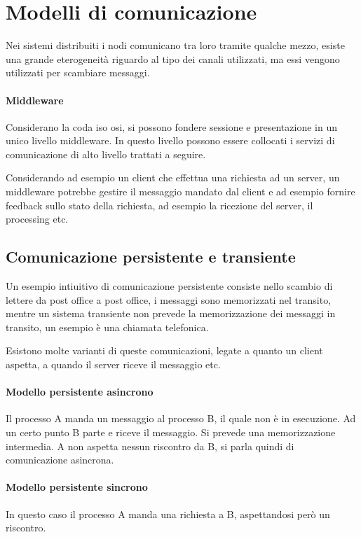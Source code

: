 \section{Modelli di comunicazione}
Nei sistemi distribuiti i nodi comunicano tra loro tramite qualche
mezzo, esiste una grande eterogeneità riguardo al tipo dei canali utilizzati, 
ma essi vengono utilizzati per scambiare messaggi.

\paragraph{Middleware}
Considerano la coda iso osi, si possono fondere sessione e presentazione 
in un unico livello middleware. In questo livello possono essere collocati i 
servizi di comunicazione di alto livello trattati a seguire.

Considerando ad esempio un client che effettua una richiesta ad un 
server, un middleware potrebbe gestire il messaggio mandato 
dal client e ad esempio fornire feedback sullo stato della richiesta, 
ad esempio la ricezione del server, il processing etc.
\subsection{Comunicazione persistente e transiente}
Un esempio intiuitivo di comunicazione persistente consiste nello scambio 
di lettere da post office a post office, i messaggi sono 
memorizzati nel transito, mentre un sistema transiente non 
prevede la memorizzazione dei messaggi in transito, un esempio è una chiamata 
telefonica.

Esistono molte varianti di queste comunicazioni, legate a quanto 
un client aspetta, a quando il server riceve il messaggio etc.

\paragraph{Modello persistente asincrono}
Il processo A manda un messaggio al processo B, il quale non è in esecuzione.
Ad un certo punto B parte e riceve il messaggio. Si prevede una memorizzazione 
intermedia. A non aspetta nessun riscontro da B, si parla quindi di comunicazione 
asincrona.

\paragraph{Modello persistente sincrono}
In questo caso il processo A manda una richiesta a B, aspettandosi però 
un riscontro.

